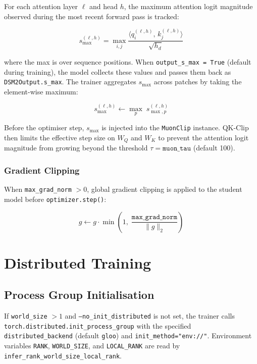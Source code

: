 \documentclass[11pt,a4paper]{article}
\begin{document}
For each attention layer $\ell$ and head $h$, the maximum attention logit magnitude observed during
the most recent forward pass is tracked:

\begin{equation}
  s_{\max}^{(\ell, h)} = \max_{i,j} \frac{\langle q_i^{(\ell,h)},\, k_j^{(\ell,h)} \rangle}{\sqrt{h_d}}
\end{equation}

where the max is over sequence positions.  When \texttt{output\_s\_max = True} (default during
training), the model collects these values and passes them back as \texttt{DSM2Output.s\_max}.  The
trainer aggregates $s_{\max}$ across patches by taking the element-wise maximum:

\begin{equation}
  s_{\max}^{(\ell,h)} \leftarrow \max_{p}\; s_{\max,p}^{(\ell,h)}
\end{equation}

Before the optimiser step, $s_{\max}$ is injected into the \texttt{MuonClip} instance.  QK-Clip
then limits the effective step size on $W_Q$ and $W_K$ to prevent the attention logit magnitude from
growing beyond the threshold $\tau = \texttt{muon\_tau}$ (default 100).

\subsubsection{Gradient Clipping}

When \texttt{max\_grad\_norm} $> 0$, global gradient clipping is applied to the student model
before \texttt{optimizer.step()}:

\begin{equation}
  g \leftarrow g \cdot \min\!\left(1,\; \frac{\texttt{max\_grad\_norm}}{\|g\|_2}\right)
\end{equation}

\section{Distributed Training}

\subsection{Process Group Initialisation}

If \texttt{world\_size} $> 1$ and \texttt{--no\_init\_distributed} is not set, the trainer calls
\texttt{torch.distributed.init\_process\_group} with the specified \texttt{distributed\_backend}
(default \texttt{gloo}) and \texttt{init\_method="env://"}.  Environment variables
\texttt{RANK}, \texttt{WORLD\_SIZE}, and \texttt{LOCAL\_RANK} are read by
\texttt{infer\_rank\_world\_size\_local\_rank}.
\end{document}
